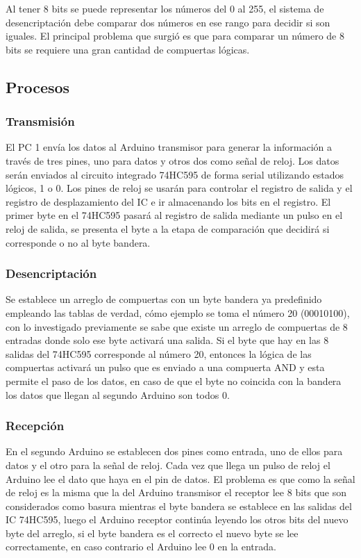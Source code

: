 \documentclass{article}
\begin{document}
Al tener 8 bits se puede representar los números del 0 al 255, el sistema de desencriptación debe comparar dos números en ese rango para decidir si son iguales. El principal problema que surgió es que para comparar un número de 8 bits se requiere una gran cantidad de compuertas lógicas.


\newpage
\subsection{Procesos}

\subsubsection{Transmisión}
El PC 1 envía los datos al Arduino transmisor para generar la información a través de tres pines, uno para datos y otros dos como señal de reloj. Los datos serán enviados al circuito integrado 74HC595 de forma serial utilizando estados lógicos, 1 o 0. Los pines de reloj se usarán para controlar el registro de salida y el registro de desplazamiento del IC e ir almacenando los bits en el registro. El primer byte en el 74HC595 pasará al registro de salida mediante un pulso en el reloj de salida, se presenta el byte a la etapa de comparación que decidirá si corresponde o no al byte bandera. 

\subsubsection{Desencriptación}
Se establece un arreglo de compuertas con un byte bandera ya predefinido empleando las tablas de verdad, cómo ejemplo se toma el número 20 (00010100), con lo investigado previamente se sabe que existe un arreglo de compuertas de 8 entradas donde solo ese byte activará una salida. Si el byte que hay en las 8 salidas del 74HC595 corresponde al número 20, entonces la lógica de las compuertas activará un pulso que es enviado a una compuerta AND y esta permite el paso de los datos, en caso de que el byte no coincida con la bandera los datos que llegan al segundo Arduino son todos 0.

\subsubsection{Recepción}
En el segundo Arduino se establecen dos pines como entrada, uno de ellos para datos y el otro para la señal de reloj. Cada vez que llega un pulso de reloj el Arduino lee el dato que haya en el pin de datos. El problema es que como la señal de reloj es la misma que la del Arduino transmisor el receptor lee 8 bits que son considerados como basura mientras el byte bandera se establece en las salidas del IC 74HC595, luego el Arduino receptor continúa leyendo los otros bits del nuevo byte del arreglo, si el byte bandera es el correcto el nuevo byte se lee correctamente, en caso contrario el Arduino lee 0 en la entrada.
\end{document}
